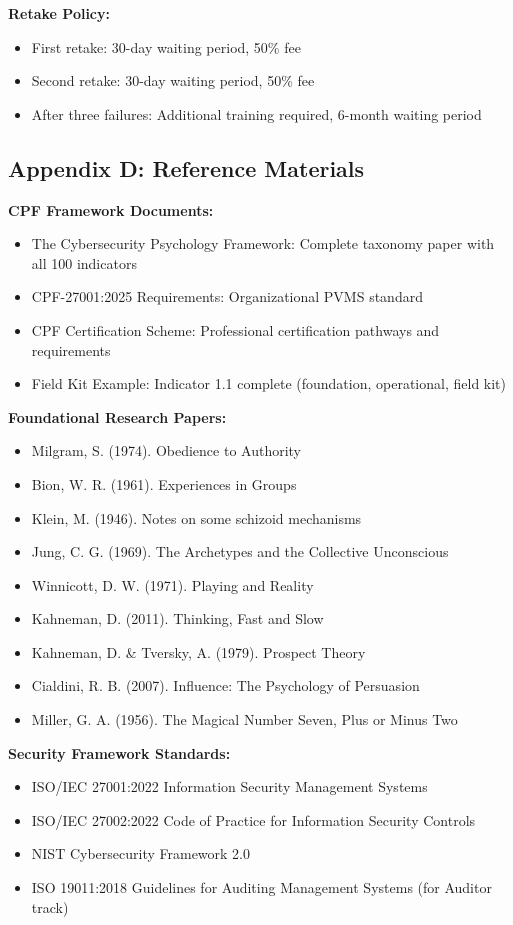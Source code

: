 \documentclass[11pt,a4paper]{article}
\begin{document}
\textbf{Retake Policy:}
\begin{itemize}
\item First retake: 30-day waiting period, 50\% fee
\item Second retake: 30-day waiting period, 50\% fee
\item After three failures: Additional training required, 6-month waiting period
\end{itemize}

\subsection{Appendix D: Reference Materials}

\textbf{CPF Framework Documents:}
\begin{itemize}
\item The Cybersecurity Psychology Framework: Complete taxonomy paper with all 100 indicators
\item CPF-27001:2025 Requirements: Organizational PVMS standard
\item CPF Certification Scheme: Professional certification pathways and requirements
\item Field Kit Example: Indicator 1.1 complete (foundation, operational, field kit)
\end{itemize}

\textbf{Foundational Research Papers:}
\begin{itemize}
\item Milgram, S. (1974). Obedience to Authority
\item Bion, W. R. (1961). Experiences in Groups
\item Klein, M. (1946). Notes on some schizoid mechanisms
\item Jung, C. G. (1969). The Archetypes and the Collective Unconscious
\item Winnicott, D. W. (1971). Playing and Reality
\item Kahneman, D. (2011). Thinking, Fast and Slow
\item Kahneman, D. \& Tversky, A. (1979). Prospect Theory
\item Cialdini, R. B. (2007). Influence: The Psychology of Persuasion
\item Miller, G. A. (1956). The Magical Number Seven, Plus or Minus Two
\end{itemize}

\textbf{Security Framework Standards:}
\begin{itemize}
\item ISO/IEC 27001:2022 Information Security Management Systems
\item ISO/IEC 27002:2022 Code of Practice for Information Security Controls
\item NIST Cybersecurity Framework 2.0
\item ISO 19011:2018 Guidelines for Auditing Management Systems (for Auditor track)
\end{itemize}
\end{document}
